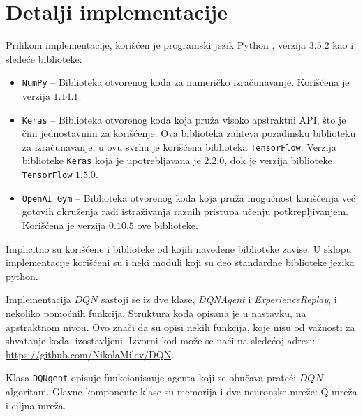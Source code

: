 \section{Detalji implementacije}
\label{sec:implementacija}
Prilikom implementacije, korišćen je programski jezik Python \cite{python}, verzija $3.5.2$ kao i sledeće biblioteke:
\begin{itemize}
	\item \texttt{NumPy} \cite{numpy} -- Biblioteka otvorenog koda za numeričko izračunavanje. Korišćena je verzija $1.14.1$.
	\item \texttt{Keras} \cite{keras} -- Biblioteka otvorenog koda koja pruža visoko apstraktni API, što je čini jednostavnim za korišćenje. Ova biblioteka zahteva pozadinsku biblioteku za izračunavanje; u ovu svrhu je korišćena biblioteka \texttt{TensorFlow}\cite{tensorflow}. Verzija biblioteke \texttt{Keras} koja je upotrebljavana je $2.2.0$, dok je verzija biblioteke \texttt{TensorFlow} $1.5.0$.
	\item  \texttt{OpenAI~Gym} \cite{openai_gym} -- Biblioteka otvorenog koda koja pruža mogućnost korišćenja već gotovih okruženja radi istraživanja raznih pristupa učenju potkrepljivanjem. Korišćena je verzija $0.10.5$ ove biblioteke.
\end{itemize}
Implicitno su korišćene i biblioteke od kojih navedene biblioteke zavise. U sklopu implementacije korišćeni su i neki moduli koji su deo standardne biblioteke jezika python.
\par 
Implementacija $DQN$ sastoji se iz dve klase, {\em DQNAgent} i {\em ExperienceReplay}, i nekoliko pomoćnih funkcija. Struktura koda opisana je u nastavku, na apstraktnom nivou. Ovo znači da su opisi nekih funkcija, koje nisu od važnosti za shvatanje koda, izostavljeni. Izvorni kod može se naći na sledećoj adresi: \url{https://github.com/NikolaMilev/DQN}.
\par 
Klasa \texttt{DQNgent} opisuje funkcionisanje agenta koji se obučava prateći $DQN$ algoritam. Glavne komponente klase su memorija i dve neuronske mreže: Q mreža i ciljna mreža.

